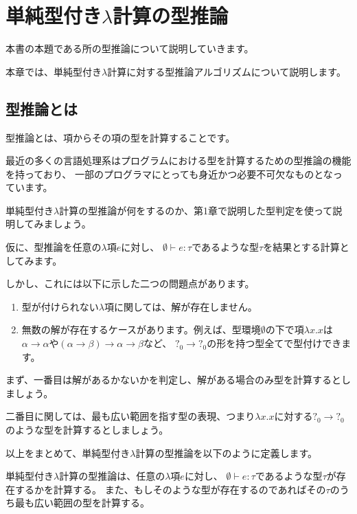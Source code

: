 
\chapter{単純型付き$\lambda$計算の型推論}

本書の本題である所の型推論について説明していきます。

本章では、単純型付き$\lambda$計算に対する型推論アルゴリズムについて説明します。

\section{型推論とは}

型推論とは、項からその項の型を計算することです。

最近の多くの言語処理系はプログラムにおける型を計算するための型推論の機能を持っており、
一部のプログラマにとっても身近かつ必要不可欠なものとなっています。

単純型付き$\lambda$計算の型推論が何をするのか、第1章で説明した型判定を使って説明してみましょう。

仮に、型推論を任意の$\lambda$項$e$に対し、
$\emptyset \vdash e : \tau$であるような型$\tau$を結果とする計算としてみます。

しかし、これには以下に示した二つの問題点があります。

\begin{enumerate}
  \item 型が付けられない$\lambda$項に関しては、解が存在しません。
  \item 無数の解が存在するケースがあります。例えば、型環境$\emptyset$の下で項$\lambda x . x$は
       $\alpha \to \alpha$や$(\alpha \to \beta) \to \alpha \to \beta$など、
       $?_0 \to ?_0$の形を持つ型全てで型付けできます。
\end{enumerate}

まず、一番目は解があるかないかを判定し、解がある場合のみ型を計算するとしましょう。

二番目に関しては、最も広い範囲を指す型の表現、つまり$\lambda x . x$に対する$?_0 \to ?_0$
のような型を計算するとしましょう。

以上をまとめて、単純型付き$\lambda$計算の型推論を以下のように定義します。

\begin{definition}
単純型付き$\lambda$計算の型推論は、任意の$\lambda$項$e$に対し、
$\emptyset \vdash e : \tau$であるような型$\tau$が存在するかを計算する。
また、もしそのような型が存在するのであればその$\tau$のうち最も広い範囲の型を計算する。
\end{definition}

